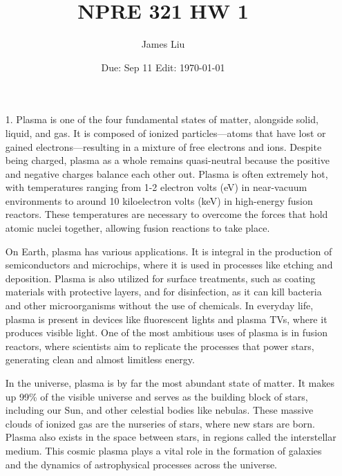 \documentclass{article}
\date{Due: Sep 11 Edit: \today}
\title{NPRE 321 HW 1}
\author{James Liu}
\begin{document}
\maketitle
\begin{itemize}
\item[1.] Plasma is one of the four fundamental states of matter, alongside solid, liquid, and gas. It is composed of ionized particles—atoms that have lost or gained electrons—resulting in a mixture of free electrons and ions. Despite being charged, plasma as a whole remains quasi-neutral because the positive and negative charges balance each other out. Plasma is often extremely hot, with temperatures ranging from 1-2 electron volts (eV) in near-vacuum environments to around 10 kiloelectron volts (keV) in high-energy fusion reactors. These temperatures are necessary to overcome the forces that hold atomic nuclei together, allowing fusion reactions to take place.

On Earth, plasma has various applications. It is integral in the production of semiconductors and microchips, where it is used in processes like etching and deposition. Plasma is also utilized for surface treatments, such as coating materials with protective layers, and for disinfection, as it can kill bacteria and other microorganisms without the use of chemicals. In everyday life, plasma is present in devices like fluorescent lights and plasma TVs, where it produces visible light. One of the most ambitious uses of plasma is in fusion reactors, where scientists aim to replicate the processes that power stars, generating clean and almost limitless energy.

In the universe, plasma is by far the most abundant state of matter. It makes up 99\% of the visible universe and serves as the building block of stars, including our Sun, and other celestial bodies like nebulas. These massive clouds of ionized gas are the nurseries of stars, where new stars are born. Plasma also exists in the space between stars, in regions called the interstellar medium. This cosmic plasma plays a vital role in the formation of galaxies and the dynamics of astrophysical processes across the universe.


\end{itemize}
\end{document}
